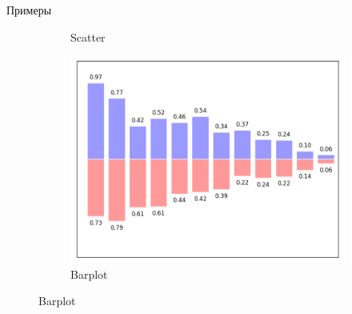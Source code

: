\documentclass[10pt]{beamer}
\begin{document}
\begin{frame}{Примеры}
\begin{figure}
\begin{subfigure}[b]{0.3\textwidth}
                \caption{Scatter}     
        \end{subfigure}
        \begin{subfigure}[b]{0.3\textwidth}
                \includegraphics[width=\textwidth]{images/bar.png}
                \caption{Barplot}     
        \end{subfigure}
        

\end{figure}
\end{frame}
\end{document}
